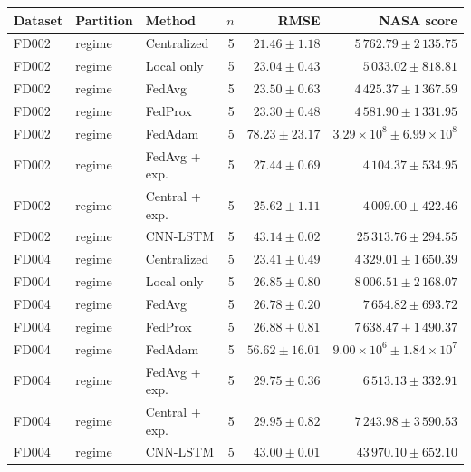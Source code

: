 \begin{tabular}{lllrrr}
\toprule
Dataset & Partition & Method & $n$ & RMSE & NASA score \\
\midrule
FD002 & regime & Centralized & 5 & $21.46\pm1.18$ & $5\,762.79\pm2\,135.75$ \\
FD002 & regime & Local only & 5 & $23.04\pm0.43$ & $5\,033.02\pm818.81$ \\
FD002 & regime & FedAvg & 5 & $23.50\pm0.63$ & $4\,425.37\pm1\,367.59$ \\
FD002 & regime & FedProx & 5 & $23.30\pm0.48$ & $4\,581.90\pm1\,331.95$ \\
FD002 & regime & FedAdam & 5 & $78.23\pm23.17$ & $3.29\times10^{8}\pm6.99\times10^{8}$ \\
FD002 & regime & FedAvg + exp. & 5 & $27.44\pm0.69$ & $4\,104.37\pm534.95$ \\
FD002 & regime & Central + exp. & 5 & $25.62\pm1.11$ & $4\,009.00\pm422.46$ \\
FD002 & regime & CNN-LSTM & 5 & $43.14\pm0.02$ & $25\,313.76\pm294.55$ \\
FD004 & regime & Centralized & 5 & $23.41\pm0.49$ & $4\,329.01\pm1\,650.39$ \\
FD004 & regime & Local only & 5 & $26.85\pm0.80$ & $8\,006.51\pm2\,168.07$ \\
FD004 & regime & FedAvg & 5 & $26.78\pm0.20$ & $7\,654.82\pm693.72$ \\
FD004 & regime & FedProx & 5 & $26.88\pm0.81$ & $7\,638.47\pm1\,490.37$ \\
FD004 & regime & FedAdam & 5 & $56.62\pm16.01$ & $9.00\times10^{6}\pm1.84\times10^{7}$ \\
FD004 & regime & FedAvg + exp. & 5 & $29.75\pm0.36$ & $6\,513.13\pm332.91$ \\
FD004 & regime & Central + exp. & 5 & $29.95\pm0.82$ & $7\,243.98\pm3\,590.53$ \\
FD004 & regime & CNN-LSTM & 5 & $43.00\pm0.01$ & $43\,970.10\pm652.10$ \\
\bottomrule
\end{tabular}
